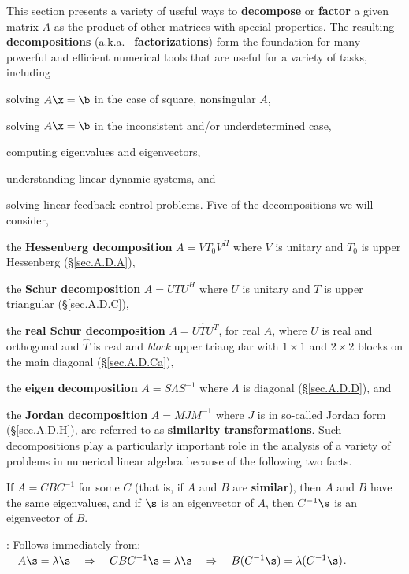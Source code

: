 This section presents a variety of useful ways to {\bf decompose} or
{\bf factor} a given matrix $A$ as the product of other matrices with
special properties.  The resulting {\bf decompositions} (a.k.a.~{\bf
factorizations}) form the foundation for many powerful and efficient
numerical tools that are useful for a variety of tasks, including
\beginmylistb
\item solving $A\x=\b$ in the case of square, nonsingular $A$,
\item solving $A\x=\b$ in the inconsistent and/or underdetermined case,
\item computing eigenvalues and eigenvectors,
\item understanding linear dynamic systems, and
\item solving linear feedback control problems.
\endmylist
Five of the decompositions we will consider,
\beginmylistb
\item the {\bf Hessenberg decomposition} $A=V T_{0} V^{H}$ where $V$ is unitary and $T_0$ is upper Hessenberg (\S \ref{sec.A.D.A}),
\item the {\bf Schur decomposition} $A=UTU^{H}$ where $U$ is unitary and $T$ is upper triangular (\S \ref{sec.A.D.C}),
\item the {\bf real Schur decomposition} $A=U{\hat T}U^{T}$, for real $A$, where $U$ is real and orthogonal and ${\hat T}$ is real and
{\it block} upper triangular with $1\times 1$ and $2\times 2$ blocks on the main diagonal (\S \ref{sec.A.D.Ca}),
\item the {\bf eigen decomposition} $A=S\Lambda S^{-1}$ where $\Lambda$ is diagonal (\S \ref{sec.A.D.D}), and
\item the {\bf Jordan decomposition} $A=MJM^{-1}$ where $J$ is in so-called Jordan form (\S \ref{sec.A.D.H}),
\endmylist
are referred to as {\bf similarity transformations}.  Such
decompositions play a particularly important role in the analysis of a
variety of problems in numerical linear algebra because of the
following two facts.\medskip

\begin{fact} \label{fact.A.D.A}
If $A=CBC^{-1}$ for some $C$ (that is, if $A$
and $B$ are {\bf similar}), then $A$ and $B$ have the same
eigenvalues, and if $\s$ is an eigenvector of $A$, then $C^{-1}\s$ is
an eigenvector of $B$.
\end{fact}

\/: Follows immediately from:
$\quad A\s=\lambda\s \quad \Rightarrow \quad CBC^{-1}\s=\lambda\s \quad \Rightarrow \quad B(C^{-1}\s)=\lambda(C^{-1}\s)$. \endproof

